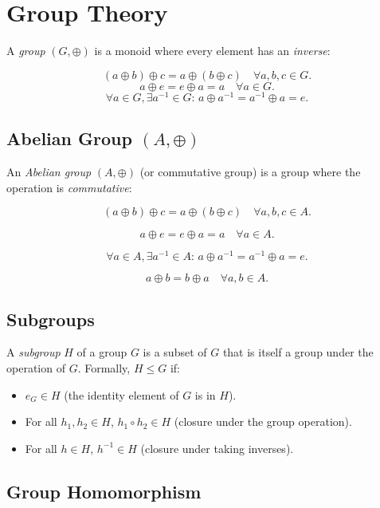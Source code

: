 \chapter{Group Theory}

A \emph{group} \((G, \oplus)\) is a monoid where every element has an \emph{inverse}:


\[
	(a \oplus b) \oplus c = a \oplus (b \oplus c) \quad \forall a, b, c \in G.
\]
\[
	a \oplus e = e \oplus a = a \quad \forall a \in G.
\]
\[
	\forall a \in G, \exists a^{-1} \in G: \, a \oplus a^{-1} = a^{-1} \oplus a = e.
\]

\section{Abelian Group \texorpdfstring{\((A, \oplus)\)}{}}

An \emph{Abelian group} \((A, \oplus)\) (or commutative group) is a group where the operation is \emph{commutative}:


\[
	(a \oplus b) \oplus c = a \oplus (b \oplus c) \quad \forall a, b, c \in A.
\]

\[
	a \oplus e = e \oplus a = a \quad \forall a \in A.
\]

\[
	\forall a \in A, \exists a^{-1} \in A: \, a \oplus a^{-1} = a^{-1} \oplus a = e.
\]

\[
	a \oplus b = b \oplus a \quad \forall a, b \in A.
\]
\section{Subgroups}

A \emph{subgroup} \(H\) of a group \(G\) is a subset of \(G\) that is itself a group under the operation of \(G\). Formally, \(H \leq G\) if:

\begin{itemize}

	\item \(e_G \in H\) (the identity element of \(G\) is in \(H\)).

	\item For all \(h_1, h_2 \in H\), \(h_1 \circ h_2 \in H\) (closure under the group operation).

	\item For all \(h \in H\), \(h^{-1} \in H\) (closure under taking inverses).

\end{itemize}

\section{Group Homomorphism}


